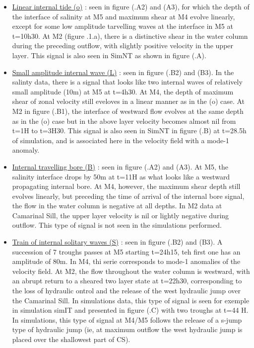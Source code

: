 \begin{itemize}
\item \underline{Linear internal tide (o)} : seen in figure (.A2) and (A3), for which the depth of the interface of salinity at M5 and maximum shear at M4 evolve linearly, except for some low amplitude tarvelling waves at the interface in M5 at t=10h30. At M2 (figure .1.a), there is a distinctive shear in the water column during the preceding outflow, with slightly positive velocity in the upper layer. This signal is also seen in SimNT as shown in figure (.A).
%
\item \underline{Small amplitude internal wave (L)} : seen in figure (.B2) and (B3). In the salinty data, there is a signal that looks like two internal waves of relatively small amplitude (10m) at M5 at t=4h30. At M4, the depth of maximum shear of zonal velocity still eveloves in a linear manner as in the (o) case. At M2 in figure (.B1), the interface of westward flow evolves at the same depth as in the (o) case but in the above layer velocity becomes almost nil from t=1H to t=3H30. This signal is also seen in SimNT in figure (.B) at t=28.5h of simulation, and is associated here in the velocity field with a mode-1 anomaly.
%
\item \underline{Internal travelling bore (B)} : seen in figure (.A2) and (A3). At M5, the salinity interface drops by 50m at t=11H as what looks like a westward propagating internal bore. At M4, however, the maximum shear depth still evolves linearly, but preceding the time of arrival of the internal bore signal, the flow in the water column is negative at all depths. In M2 data at Camarinal Sill, the upper layer velocity is nil or lightly negative during outflow. This type of signal is not seen in the simulations performed.
%
\item \underline{Train of internal solitary waves (S)} : seen in figure (.B2) and (B3). A succession of 7 troughs passes at M5 starting t=24h15, teh first one has an amplitude of 80m. In M4, thi serie corresponds to mode-1 anomalies of the velocity field. At M2, the flow throughout the water column is westward, with an abrupt return to a sheared two layer state at t=22h30, corresponding to the loss of hydraulic ontrol and the release of the west hydraulic jump over the Camarinal Sill. In simulations data, this type of signal is seen for exemple in simulation simIT and presented in figure (.C) with two troughs at t=44 H. In simulations, this type of signal at M4/M5 follows the release of a s-jump type of hydraulic jump (ie, at maximum outflow the west hydraulic jump is placed over the shallowest part of CS).

\end{itemize}
